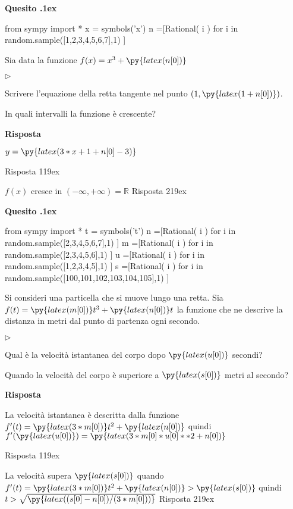 \documentclass[11pt,twoside,a4paper]{article}
\newcommand{\mylabel}[1]{#1\hfill}
\renewenvironment{itemize}
  {\begin{list}{$\triangleright$}{%
   \setlength{\parskip}{0mm}
   \setlength{\topsep}{.4\baselineskip}
   \setlength{\rightmargin}{0mm}
   \setlength{\listparindent}{0mm}
   \setlength{\itemindent}{0mm}
   \setlength{\labelwidth}{2ex}
   \setlength{\itemsep}{.4\baselineskip}
   \setlength{\parsep}{0mm}
   \setlength{\partopsep}{0mm}
   \setlength{\labelsep}{1ex}
   \setlength{\leftmargin}{\labelwidth+\labelsep}
   \let\makelabel\mylabel}}{%
   \end{list}\vspace*{-1.3mm}}
\newcounter{quesito}
\newenvironment{question}{\bigskip\addtocounter{quesito}{1}\bigskip\bigskip\par\textbf{Quesito \thequesito.\kern1ex}}{\vspace{\parskip}}
\newenvironment{answer}{\par\textbf{Risposta\quad}}{\vspace{\parskip}}
\begin{document}
\begin{question}
\def\RR{{\mathds R}}
\begin{pycode}
from sympy import *
x = symbols('x')
n =[Rational( i ) for i in random.sample([1,2,3,4,5,6,7],1) ]
\end{pycode}
Sia data la funzione $f(x) = x^3 + \py{latex(n[0])}$
\begin{itemize}
\item[1.] Scrivere l'equazione della retta tangente nel punto $(1, \py{latex(1+n[0])})$.
\item[2.] In quali intervalli la funzione è crescente?
\end{itemize}
\begin{answer}

{\color{blue}
$y = \py{latex(3*x+1+n[0]-3)}$ }

{\color{blue}
\hfill Risposta 1\kern19ex}

{\color{blue}
$f(x)$ cresce in $(-\infty,+\infty) = \RR$
\hfill Risposta 2\kern19ex}

\end{answer}
\end{question}
\begin{question}
\begin{pycode}
from sympy import *
t = symbols('t')
n =[Rational( i ) for i in random.sample([2,3,4,5,6,7],1) ]
m =[Rational( i ) for i in random.sample([2,3,4,5,6],1) ]
u =[Rational( i ) for i in random.sample([1,2,3,4,5],1) ]
s =[Rational( i ) for i in random.sample([100,101,102,103,104,105],1) ]
\end{pycode}
Si consideri una particella che si muove lungo una retta. Sia $f(t) = \py{latex(m[0])} t^3 + \py{latex(n[0])} t$ la funzione che ne descrive la distanza in metri dal punto di partenza ogni secondo.
\begin{itemize}
\item[1.] Qual è la velocità istantanea del corpo dopo $\py{latex(u[0])}$ secondi?
\item[2.] Quando la velocità del corpo è superiore a $\py{latex(s[0])}$ metri al secondo?
\end{itemize}
\begin{answer}

La velocità istantanea è descritta dalla funzione $f'(t) = \py{latex(3*m[0])} t^2 + \py{latex(n[0])}$ quindi
{\color{blue}
$f'(\py{latex(u[0])}) = \py{latex(3*m[0]*u[0]**2+n[0])}$ }

{\color{blue}
\hfill Risposta 1\kern19ex}

La velocità supera $\py{latex(s[0])}$ quando $f'(t) = \py{latex(3*m[0])} t^2 + \py{latex(n[0])} > \py{latex(s[0])}$ quindi
{\color{blue}
$t > \sqrt{\py{latex((s[0]-n[0])/(3*m[0]))}}$
\hfill Risposta 2\kern19ex}

\end{answer}
\end{question}
\end{document}
